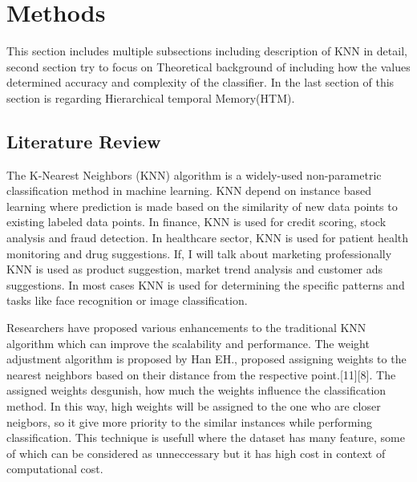 \documentclass[conference]{IEEEtran}
\begin{document}
\section{Methods}

This section includes multiple subsections including description of KNN in detail, second section try to focus on Theoretical background of including how the values determined accuracy and complexity  of the classifier. In the last section of this section is regarding Hierarchical temporal Memory(HTM). 



\subsection{Literature Review}
The K-Nearest Neighbors (KNN) algorithm is a widely-used non-parametric classification method in machine learning. KNN depend on instance based learning where prediction is made based on the similarity of new data points to existing labeled data points. In finance, KNN is used for credit scoring, stock analysis and fraud detection. In healthcare sector, KNN is used for patient health monitoring and drug suggestions. If, I will talk about marketing professionally KNN is used as product suggestion, market trend analysis and customer ads suggestions. In most cases KNN is used for determining the specific patterns and tasks like face recognition or image classification. 

Researchers have proposed various enhancements to the traditional KNN algorithm which can improve the scalability and performance. The weight adjustment algorithm is proposed by Han EH., proposed assigning weights to the nearest neighbors based on their distance from the respective point.[11][8]. The assigned weights desgunish, how much the weights influence the classification method. In this way, high weights will be assigned to the one who are closer neigbors, so it give more priority to the similar instances while performing classification.  This technique is usefull where the dataset has many feature, some of which can be considered as unneccessary but it has high cost in context of computational cost.
\end{document}
